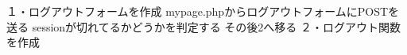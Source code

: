 １・ログアウトフォームを作成
        mypage.phpからログアウトフォームにPOSTを送る
        sessionが切れてるかどうかを判定する
        その後2へ移る
２・ログアウト関数を作成